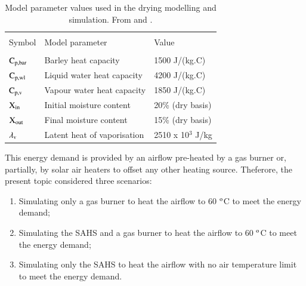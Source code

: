 \begin{table}[!ht]
	\caption{Model parameter values used in the drying modelling and simulation. From \citet{Bala2017} and \citet{Cenkowski1992}.}
	\centering
	\begin{tabular}{p{2cm}p{6cm}p{3.5cm}}
		\hline \\[-10pt]
		Symbol & Model parameter & Value \\ [2pt]
		\hline \\[-12pt]
		$\rm{C_{p,bar}}$ & Barley heat capacity & 1500 J/(kg.\textdegree C) \\ [2pt]
		
		$\rm{C_{p,wl}}$ & Liquid water heat capacity & 4200 J/(kg.\textdegree C) \\ [2pt]
		
		$\rm{C_{p,v}}$ & Vapour water heat capacity & 1850 J/(kg.\textdegree C) \\ [2pt]
		
		$\rm{X_{in}}$ & Initial moisture content & 20\% (dry basis) \\ [2pt]
		
		$\rm{X_{out}}$ & Final moisture content & 15\% (dry basis) \\ [2pt]
		
		$\rm{\lambda_v}$ & Latent heat of vaporisation & 2510 {\footnotesize x} 10$^3$ J/kg \\
		
		\hline 
	\end{tabular}
	\label{drying_parameters}
\end{table}

This energy demand is provided by an airflow pre-heated by a gas burner or, partially, by solar air heaters to offset any other heating source. Theferore, the present topic considered three scenarios: 
\begin{enumerate}
	\item Simulating only a gas burner to heat the airflow to 60 $^{\rm{o}}$C to meet the energy demand;
	\item Simulating the SAHS and a gas burner to heat the airflow to 60 $^{\rm{o}}$C to meet the energy demand;
	\item Simulating only the SAHS to heat the airflow with no air temperature limit to meet the energy demand.
\end{enumerate}


